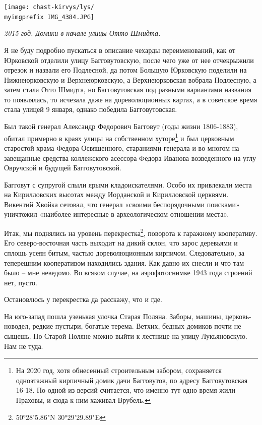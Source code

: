 \begin{center}
\texttt{[image: chast-kirvys/lys/\\myimgprefix IMG\_4384.JPG]}

\textit{2015 год. Домики в начале улицы Отто Шмидта.}
\end{center} 
\vspace*{\fill}
\newpage

Я не буду подробно пускаться в описание чехарды переименований, как от Юрковской отделили улицу Багговутовскую, после чего уже от нее отчекрыжили отрезок и назвали его Подлесной, да потом Большую Юрковскую поделили на Нижнеюрковскую и Верхнеюрковскую, а Верхнеюрковская вобрала Подлесную, а затем стала Отто Шмидта, но Багговутовская под разными вариантами названия то появлялась, то исчезала даже на дореволюционных картах, а в советское время стала улицей 9 января, однако победила Багговутовская.

Был такой генерал Александр Федорович Багговут (годы жизни 1806-1883), обитал примерно в краях улицы на собственном хуторе\footnote{На 2020 год, хотя обнесенный строительным забором, сохраняется одноэтажный кирпичный домик дачи Багговутов, по адресу Багговутовская 16-18. По одной из версий считается, что именно тут одно время жили Праховы, и сюда к ним хаживал Врубель.} и был церковным старостой храма Федора Освященного, стараниями генерала и во многом на завещанные средства коллежского асессора Федора Иванова возведенного на углу Овручской и будущей Багговутовской.

Багговут с супругой слыли ярыми кладоискателями. Особо их привлекали места на Кирилловских высотах между Иорданской и Кирилловской церквями. Викентий Хвойка сетовал, что генерал «своими беспорядочными поисками» уничтожил «наиболее интересные в археологическом отношении места».

Итак, мы поднялись на уровень перекрестка\footnote{50°28'5.86"N 30°29'29.89"E}, поворота к гаражному кооперативу. Его северо-восточная часть выходит на дикий склон, что зарос деревьями и сплошь усеян битым, частью дореволюционным кирпичом. Следовательно, за теперешним кооперативом находились здания. Как давно их снесли и что там было – мне неведомо. Во всяком случае, на аэрофотоснимке 1943 года строений нет, пусто.

Остановлюсь у перекрестка да расскажу, что и где.

На юго-запад пошла узенькая улочка Старая Поляна. Заборы, машины, церковь-новодел, редкие пустыри, богатые терема. Ветхих, бедных домиков почти не сыщешь. По Старой Поляне можно выйти к лестнице на улицу Лукьяновскую. Нам не туда.

